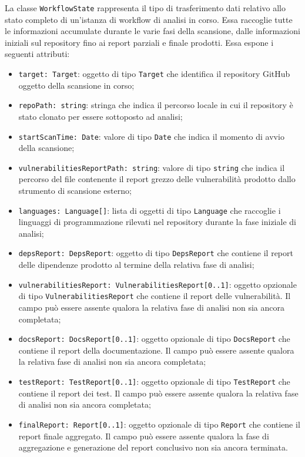 \documentclass[a4paper, 11pt]{article}
\begin{document}
La classe \texttt{WorkflowState} rappresenta il tipo di trasferimento dati relativo allo stato
completo di un'istanza di workflow di analisi in corso. Essa raccoglie tutte le informazioni
accumulate durante le varie fasi della scansione, dalle informazioni iniziali sul repository fino
ai report parziali e finale prodotti. Essa espone i seguenti attributi:

\begin{itemize}
  \item \texttt{target: Target}: oggetto di tipo \texttt{Target} che identifica il repository
    GitHub oggetto della scansione in corso;

  \item \texttt{repoPath: string}: stringa che indica il percorso locale in cui il repository
    è stato clonato per essere sottoposto ad analisi;

  \item \texttt{startScanTime: Date}: valore di tipo \texttt{Date} che indica il momento di avvio
    della scansione;

  \item \texttt{vulnerabilitiesReportPath: string}: valore di tipo \texttt{string} che indica il
    percorso del file contenente il report grezzo delle vulnerabilità prodotto dallo strumento di
    scansione esterno;

  \item \texttt{languages: Language[]}: lista di oggetti di tipo \texttt{Language} che raccoglie
    i linguaggi di programmazione rilevati nel repository durante la fase iniziale di analisi;

  \item \texttt{depsReport: DepsReport}: oggetto di tipo \texttt{DepsReport} che contiene il
    report delle dipendenze prodotto al termine della relativa fase di analisi;

  \item \texttt{vulnerabilitiesReport: VulnerabilitiesReport[0..1]}: oggetto opzionale di tipo \newline
    \texttt{VulnerabilitiesReport} che contiene il report delle vulnerabilità. Il campo può essere
    assente qualora la relativa fase di analisi non sia ancora completata;

  \item \texttt{docsReport: DocsReport[0..1]}: oggetto opzionale di tipo \texttt{DocsReport} che
    contiene il report della documentazione. Il campo può essere assente qualora la relativa fase
    di analisi non sia ancora completata;

  \item \texttt{testReport: TestReport[0..1]}: oggetto opzionale di tipo \texttt{TestReport} che
    contiene il report dei test. Il campo può essere assente qualora la relativa fase di analisi
    non sia ancora completata;

  \item \texttt{finalReport: Report[0..1]}: oggetto opzionale di tipo \texttt{Report} che contiene
    il report finale aggregato. Il campo può essere assente qualora la fase di aggregazione e
    generazione del report conclusivo non sia ancora terminata.
\end{itemize}
\end{document}
